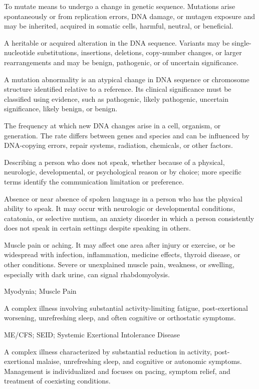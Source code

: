  To mutate means to undergo a change in genetic sequence. Mutations arise spontaneously or from replication errors, DNA damage, or mutagen exposure and may be inherited, acquired in somatic cells, harmful, neutral, or beneficial.

 A heritable or acquired alteration in the DNA sequence. Variants may be
single-nucleotide substitutions, insertions, deletions, copy-number changes, or larger
rearrangements and may be benign, pathogenic, or of uncertain significance.

 A mutation abnormality is an atypical change in DNA sequence or chromosome structure identified relative to a reference. Its clinical significance must be classified using evidence, such as pathogenic, likely pathogenic, uncertain significance, likely benign, or benign.

 The frequency at which new DNA changes arise in a cell, organism, or generation. The rate differs between genes and species and can be influenced by DNA-copying errors, repair systems, radiation, chemicals, or other factors.

 Describing a person who does not speak, whether because of a physical, neurologic, developmental, or psychological reason or by choice; more specific terms identify the communication limitation or preference.

 Absence or near absence of spoken language in a person who has the physical ability to speak. It may occur with neurologic or developmental conditions, catatonia, or selective mutism, an anxiety disorder in which a person consistently does not speak in certain settings despite speaking in others.

 Muscle pain or aching. It may affect one area after injury or exercise,
or be widespread with infection, inflammation, medicine effects, thyroid disease, or other
conditions. Severe or unexplained muscle pain, weakness, or swelling, especially with dark
urine, can signal rhabdomyolysis.

\synonyms
Myodynia; Muscle Pain

 A complex illness involving substantial activity-limiting fatigue, post-exertional worsening, unrefreshing sleep, and often cognitive or orthostatic symptoms.

\synonyms
ME/CFS; SEID; Systemic Exertional Intolerance Disease

 A complex illness characterized by substantial reduction in
activity, post-exertional malaise, unrefreshing sleep, and cognitive or autonomic symptoms. Management is individualized
and focuses on pacing, symptom relief, and treatment of coexisting conditions.


